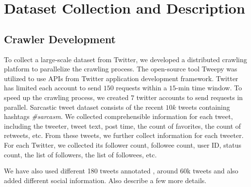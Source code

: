 \section{Dataset Collection and Description}
\label{sec:dataset}
\subsection{Crawler Development}
To collect a large-scale dataset from Twitter, we developed a distributed crawling platform to parallelize the crawling process. The open-source tool Tweepy was utilized to use APIs from Twitter application development framework. Twitter has limited each account to send $150$ requests within a $15$-min time window. To speed up the crawling process, we created $7$ twitter accounts to send requests in parallel. Sarcastic tweet dataset consists of the recent $10k$ tweets containing hashtags \emph{\#sarcasm}. We collected comprehensible information for each tweet, including the tweeter, tweet text, post time, the count of favorites, the count of retweets, etc. From these tweets, we further collect information for each tweeter. For each Twitter, we collected its follower count, followee count, user ID, status count, the list of followers, the list of followees, etc.

We have also used different 180 tweets annotated \cite{davidov10}, around 60k tweets \cite{tomas14} and also added different social information. Also describe a few more details.\\ 